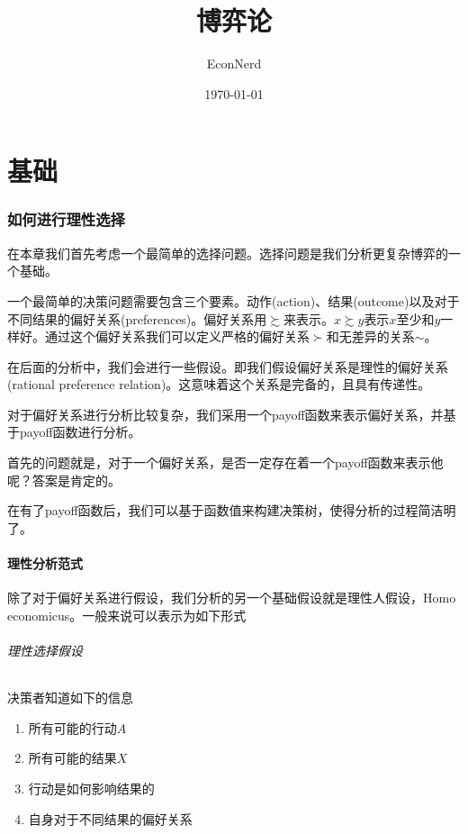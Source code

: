 \documentclass[UTF8,12pt]{ctexart}
\title{博弈论} %
\author{EconNerd}
\date{\today}
\numberwithin{equation}{section} %
\numberwithin{figure}{section}
\numberwithin{table}{section}
\begin{document}
	\maketitle
	\tableofcontents
	
	\newpage
	
	\part{基础}
	\section{如何进行理性选择}
	在本章我们首先考虑一个最简单的选择问题。选择问题是我们分析更复杂博弈的一个基础。
	
	一个最简单的决策问题需要包含三个要素。动作(action)、结果(outcome)以及对于不同结果的偏好关系(preferences)。偏好关系用$\succsim$来表示。$x \succsim y$表示$x$至少和$y$一样好。通过这个偏好关系我们可以定义严格的偏好关系$\succ$和无差异的关系$\sim$。
	
	在后面的分析中，我们会进行一些假设。即我们假设偏好关系是理性的偏好关系(rational preference relation)。这意味着这个关系是完备的，且具有传递性。
	
	对于偏好关系进行分析比较复杂，我们采用一个payoff函数来表示偏好关系，并基于payoff函数进行分析。
	
	首先的问题就是，对于一个偏好关系，是否一定存在着一个payoff函数来表示他呢？答案是肯定的。
	
	在有了payoff函数后，我们可以基于函数值来构建决策树，使得分析的过程简洁明了。
	
	\subsection{理性分析范式}
	除了对于偏好关系进行假设，我们分析的另一个基础假设就是理性人假设，Homo economicus。一般来说可以表示为如下形式
	
	\paragraph{理性选择假设}
	决策者知道如下的信息
	\begin{enumerate}
		\item 所有可能的行动$A$
		
		\item 所有可能的结果$X$
		
		\item 行动是如何影响结果的
		
		\item 自身对于不同结果的偏好关系
	\end{enumerate}
\end{document}
